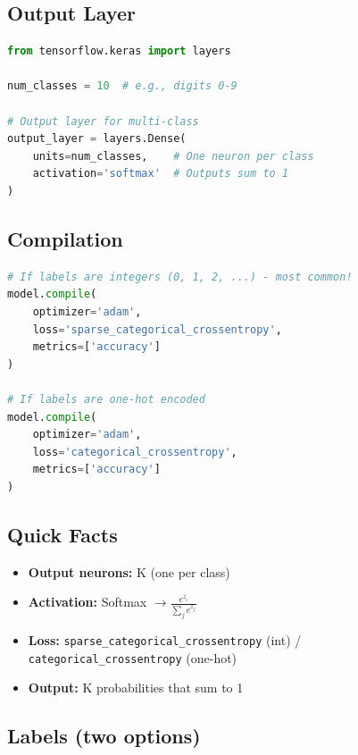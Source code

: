 \documentclass[12pt,a4paper]{article}
\begin{document}
\subsection{Output Layer}

\begin{lstlisting}[language=Python, caption=Multi-class Classification Output Layer]
from tensorflow.keras import layers

num_classes = 10  # e.g., digits 0-9

# Output layer for multi-class
output_layer = layers.Dense(
    units=num_classes,    # One neuron per class
    activation='softmax'  # Outputs sum to 1
)
\end{lstlisting}

\subsection{Compilation}

\begin{lstlisting}[language=Python, caption=Compiling for Multi-class Classification]
# If labels are integers (0, 1, 2, ...) - most common!
model.compile(
    optimizer='adam',
    loss='sparse_categorical_crossentropy',
    metrics=['accuracy']
)

# If labels are one-hot encoded
model.compile(
    optimizer='adam',
    loss='categorical_crossentropy',
    metrics=['accuracy']
)
\end{lstlisting}

\subsection{Quick Facts}

\begin{itemize}
    \item \textbf{Output neurons:} K (one per class)
    \item \textbf{Activation:} Softmax $\rightarrow \frac{e^{z_i}}{\sum_{j} e^{z_j}}$
    \item \textbf{Loss:} \texttt{sparse\_categorical\_crossentropy} (int) /\\ \texttt{categorical\_crossentropy} (one-hot)
    \item \textbf{Output:} K probabilities that sum to 1
\end{itemize}

\subsection{Labels (two options)}
\end{document}
